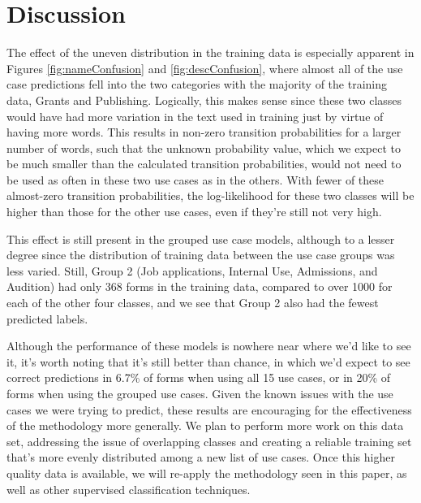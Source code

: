\documentclass{article}
\begin{document}
\section{Discussion}
The effect of the uneven distribution in the training data is especially apparent in Figures \ref{fig:nameConfusion} and \ref{fig:descConfusion}, where almost all of the use case predictions fell into the two categories with the majority of the training data, Grants and Publishing. Logically, this makes sense since these two classes would have had more variation in the text used in training just by virtue of having more words. This results in non-zero transition probabilities for a larger number of words, such that the unknown probability value, which we expect to be much smaller than the calculated transition probabilities, would not need to be used as often in these two use cases as in the others. With fewer of these almost-zero transition probabilities, the log-likelihood for these two classes will be higher than those for the other use cases, even if they're still not very high.

This effect is still present in the grouped use case models, although to a lesser degree since the distribution of training data between the use case groups was less varied. Still, Group 2 (Job applications, Internal Use, Admissions, and Audition) had only 368 forms in the training data, compared to over 1000 for each of the other four classes, and we see that Group 2 also had the fewest predicted labels.

Although the performance of these models is nowhere near where we'd like to see it, it's worth noting that it's still better than chance, in which we'd expect to see correct predictions in 6.7\% of forms when using all 15 use cases, or in 20\% of forms when using the grouped use cases. Given the known issues with the use cases we were trying to predict, these results are encouraging for the effectiveness of the methodology more generally. We plan to perform more work on this data set, addressing the issue of overlapping classes and creating a reliable training set that's more evenly distributed among a new list of use cases. Once this higher quality data is available, we will re-apply the methodology seen in this paper, as well as other supervised classification techniques.

\printbibliography
\end{document}
